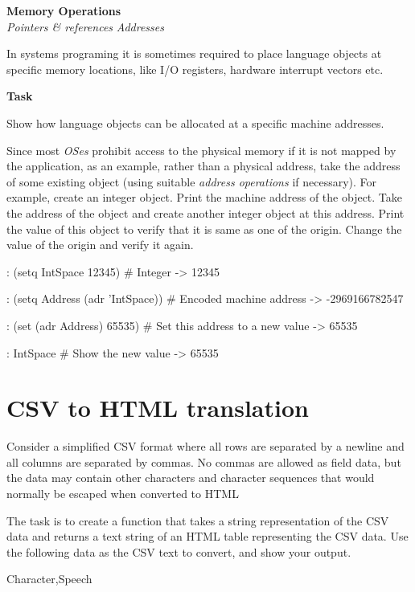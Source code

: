\textbf{Memory Operations} \\
\emph{Pointers \& references} \textbar{} \emph{Addresses}

In systems programing it is sometimes required to place language objects
at specific memory locations, like I/O registers, hardware interrupt
vectors etc.

\textbf{Task}

Show how language objects can be allocated at a specific machine
addresses.

Since most \emph{OSes} prohibit access to the physical memory if it is
not mapped by the application, as an example, rather than a physical
address, take the address of some existing object (using suitable
\emph{address operations} if necessary). For example, create an
integer object. Print the machine address of the object. Take the
address of the object and create another integer object at this
address. Print the value of this object to verify that it is same as
one of the origin. Change the value of the origin and verify it again.


\begin{wideverbatim}

: (setq IntSpace 12345)          # Integer
-> 12345

: (setq Address (adr 'IntSpace)) # Encoded machine address
-> -2969166782547

: (set (adr Address) 65535)      # Set this address to a new value
-> 65535

: IntSpace                       # Show the new value
-> 65535

\end{wideverbatim}

\pagebreak{}
\section*{CSV to HTML translation}


Consider a simplified CSV format where all rows are separated by a
newline and all columns are separated by commas. No commas are allowed
as field data, but the data may contain other characters and character
sequences that would normally be escaped when converted to HTML

The task is to create a function that takes a string representation of
the CSV data and returns a text string of an HTML table representing the
CSV data. Use the following data as the CSV text to convert, and show
your output.

Character,Speech

